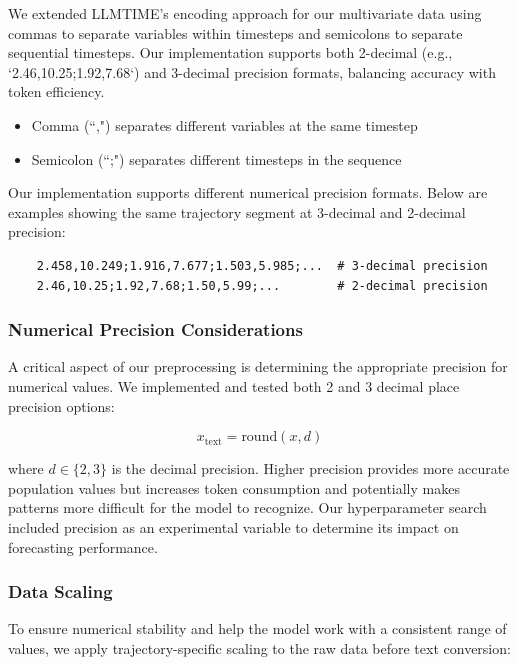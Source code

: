 \documentclass{article}
\begin{document}
We extended LLMTIME's \cite{gruver2023large} encoding approach for our multivariate data using commas to separate variables within timesteps and semicolons to separate sequential timesteps. Our implementation supports both 2-decimal (e.g., `2.46,10.25;1.92,7.68`) and 3-decimal precision formats, balancing accuracy with token efficiency.
\begin{itemize}
    \item Comma (“,") separates different variables at the same timestep
    \item Semicolon (“;") separates different timesteps in the sequence
\end{itemize}

Our implementation supports different numerical precision formats. Below are examples showing the same trajectory segment at 3-decimal and 2-decimal precision:

\begin{verbatim}
    2.458,10.249;1.916,7.677;1.503,5.985;...  # 3-decimal precision
    2.46,10.25;1.92,7.68;1.50,5.99;...        # 2-decimal precision
\end{verbatim}



\subsubsection*{Numerical Precision Considerations}

A critical aspect of our preprocessing is determining the appropriate precision for numerical values. We implemented and tested both 2 and 3 decimal place precision options:

\begin{equation}
x_{\text{text}} = \text{round}(x, d)
\end{equation}

where $d \in \{2,3\}$ is the decimal precision. Higher precision provides more accurate population values but increases token consumption and potentially makes patterns more difficult for the model to recognize. Our hyperparameter search included precision as an experimental variable to determine its impact on forecasting performance.

\subsubsection*{Data Scaling}

To ensure numerical stability and help the model work with a consistent range of values, we apply trajectory-specific scaling to the raw data before text conversion:
\end{document}
